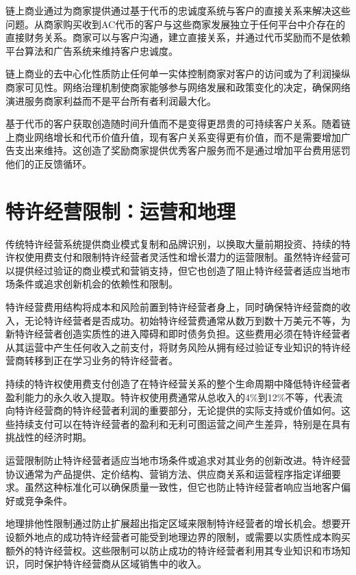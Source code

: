 \documentclass[
  Letterpaper,
]{scrbook}
\begin{document}
链上商业通过为商家提供通过基于代币的忠诚度系统与客户的直接关系来解决这些问题。从商家购买收到AC代币的客户与这些商家发展独立于任何平台中介存在的直接财务关系。商家可以与客户沟通，建立直接关系，并通过代币奖励而不是依赖平台算法和广告系统来维持客户忠诚度。

链上商业的去中心化性质防止任何单一实体控制商家对客户的访问或为了利润操纵商家可见性。网络治理机制使商家能够参与网络发展和政策变化的决定，确保网络演进服务商家利益而不是平台所有者利润最大化。

基于代币的客户获取创造随时间升值而不是变得更昂贵的可持续客户关系。随着链上商业网络增长和代币价值升值，现有客户关系变得更有价值，而不是需要增加广告支出来维持。这创造了奖励商家提供优秀客户服务而不是通过增加平台费用惩罚他们的正反馈循环。

\section{特许经营限制：运营和地理}\label{ux7279ux8bb8ux7ecfux8425ux9650ux5236ux8fd0ux8425ux548cux5730ux7406}

传统特许经营系统提供商业模式复制和品牌识别，以换取大量前期投资、持续的特许权使用费支付和限制特许经营者灵活性和增长潜力的运营限制。虽然特许经营可以提供经过验证的商业模式和营销支持，但它也创造了阻止特许经营者适应当地市场条件或追求创新机会的依赖性和限制。

特许经营费用结构将成本和风险前置到特许经营者身上，同时确保特许经营商的收入，无论特许经营者是否成功。初始特许经营费通常从数万到数十万美元不等，为新特许经营者创造实质性的进入障碍和即时债务负担。这些费用必须在特许经营者从其运营中产生任何收入之前支付，将财务风险从拥有经过验证专业知识的特许经营商转移到正在学习业务的特许经营者。

持续的特许权使用费支付创造了在特许经营关系的整个生命周期中降低特许经营者盈利能力的永久收入提取。特许权使用费通常从总收入的4\%到12\%不等，代表流向特许经营商的特许经营者利润的重要部分，无论提供的实际支持或价值如何。这些持续支付可以在特许经营者的盈利和无利可图运营之间产生差异，特别是在具有挑战性的经济时期。

运营限制防止特许经营者适应当地市场条件或追求对其业务的创新改进。特许经营协议通常为产品提供、定价结构、营销方法、供应商关系和运营程序指定详细要求。虽然这种标准化可以确保质量一致性，但它也防止特许经营者响应当地客户偏好或竞争条件。

地理排他性限制通过防止扩展超出指定区域来限制特许经营者的增长机会。想要开设额外地点的成功特许经营者可能受到地理边界的限制，或需要以实质性成本购买额外的特许经营权。这些限制可以防止成功的特许经营者利用其专业知识和市场知识，同时保护特许经营商从区域销售中的收入。
\end{document}
